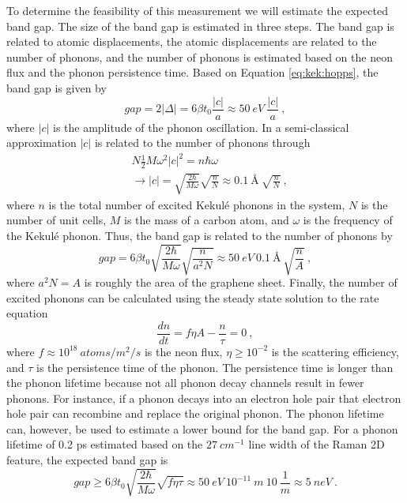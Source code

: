 To determine the feasibility of this measurement we will estimate the expected band gap.
The size of the band gap is estimated in three steps.
The band gap is related to atomic displacements, the atomic displacements are related to the number of phonons, and the number of phonons is estimated based on the neon flux and the phonon persistence time.
Based on Equation \ref{eq:kek:hopps}, the band gap is given by
\begin{equation*}
	gap=2|\Delta|=6 \beta t_0 \frac{|c|}{a} \approx 50 \ eV \ \frac{|c|}{a} \ ,
\end{equation*}
where $|c|$ is the amplitude of the phonon oscillation.
In a semi-classical approximation $|c|$ is related to the number of phonons through
\begin{align*}
	&N \frac{1}{2} M \omega^2 |c|^2=n \hbar \omega \\
	&\rightarrow |c|=\sqrt{\frac{2 \hbar}{M \omega}} \sqrt{\frac{n}{N}} \approx 0.1 \ \text{\AA} \ \sqrt{\frac{n}{N}}	\ ,
\end{align*}
where $n$ is the total number of excited Kekul\'e phonons in the system, $N$ is the number of unit cells, $M$ is the mass of a carbon atom, and $\omega$ is the frequency of the Kekul\'e phonon.
Thus, the band gap is related to the number of phonons by
\begin{equation*}
	gap=6 \beta t_0 \sqrt{\frac{2 \hbar}{M \omega}}\sqrt{\frac{n}{a^2N}} 
	\approx 50 \ eV \ 0.1 \ \text{\AA} \ \sqrt{\frac{n}{A}} \ ,
\end{equation*}
where $a^2 N=A$ is roughly the area of the graphene sheet.
Finally, the number of excited phonons can be calculated using the steady state solution to the rate equation
\begin{equation*}
	\frac{dn}{dt}=f \eta A-\frac{n}{\tau}=0 \ ,
\end{equation*}
where $f \approx 10^{18} \ atoms/m^2/s$ is the neon flux, $\eta \geq 10^{-2}$ is the scattering efficiency, and $\tau$ is the persistence time of the phonon.
The persistence time is longer than the phonon lifetime because not all phonon decay channels result in fewer phonons.
For instance, if a phonon decays into an electron hole pair that electron hole pair can recombine and replace the original phonon.
The phonon lifetime can, however, be used to estimate a lower bound for the band gap.
For a phonon lifetime of  0.2 ps estimated based on the $27 \ cm^{-1}$ line width of the Raman 2D feature, the expected band gap is
\begin{equation*}
	gap \geq 6 \beta t_0 \sqrt{\frac{2 \hbar}{M \omega}}\sqrt{f \eta \tau} \approx 50 \ eV \ 10^{-11} \ m \ 10 \ \frac{1}{m}
	\approx 5 \ neV \ .
\end{equation*}
